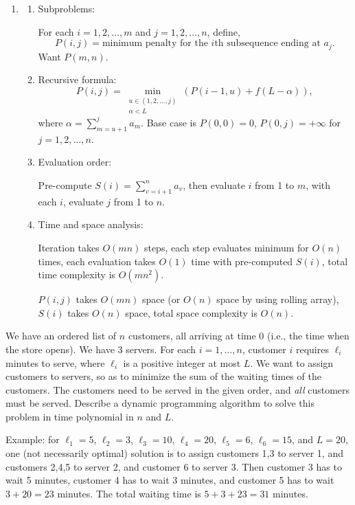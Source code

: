 \documentclass[11pt]{article}
\begin{document}
\begin{description}
\begin{enumerate}
\item[(b)]
  \begin{enumerate}
    \item[(i)] Subproblems:
    
    For each $i = 1, 2, \ldots, m$ and $j = 1, 2, \ldots, n$, define,
    \[
      P(i, j) = \text{minimum penalty for the $i$th subsequence ending at $a_j$}.
    \]
    Want $P(m, n)$.

    \item[(ii)] Recursive formula:
    \[
      P(i, j) = 
      \min_{\substack{u \in (1, 2, \ldots, j) \\ \alpha < L}}(P(i-1, u) + f(L - \alpha)),
    \]
    where $\alpha = \sum_{m=u+1}^{j}a_m$. Base case is $P(0, 0)=0$, $P(0, j)=+\infty$ for 
    $j = 1, 2, \ldots, n$.

    \item[(iii)] Evaluation order:

    Pre-compute $S(i) = \sum_{v=i+1}^{n}a_v$, then evaluate $i$ from 1 to $m$, with each $i$, 
    evaluate $j$ from 1 to $n$.

    \item[(iv)] Time and space analysis:
    
    Iteration takes $O(mn)$ steps, each step evaluates minimum for $O(n)$ times, each 
    evaluation takes $O(1)$ time with pre-computed $S(i)$, total time complexity is $O(mn^2)$.

    $P(i, j)$ takes $O(mn)$ space (or $O(n)$ space by using rolling array), $S(i)$ takes $O(n)$ space, total space complexity is $O(n)$.
  \end{enumerate}

\end{enumerate}

\newpage
\item[Problem 2.3:]
We have an ordered list of $n$ customers, all arriving at time 0 (i.e., the time when the store opens).
We have 3 servers.  For each $i=1,\ldots,n$,
customer $i$ requires $\ell_i$ minutes to serve, where $\ell_i$ is a positive integer at most $L$.
We want to assign customers to servers, so as to minimize the sum of the waiting times
of the customers.  The customers need to be served in the given order, and \emph{all} customers
must be served.
Describe a dynamic programming algorithm to solve this problem in time polynomial in $n$ and $L$.

Example: for $\ell_1=5$, $\ell_2=3$, $\ell_3=10$, $\ell_4=20$, $\ell_5=6$, $\ell_6=15$, and $L=20$,
one (not necessarily optimal) solution is to assign customers 1,3 to server 1, and customers 2,4,5 to server 2,
and customer 6 to server 3.
Then customer 3 has to wait 5 minutes, customer 4 has to wait 3 minutes, and customer 5
has to wait $3+20=23$ minutes.  The total waiting time is $5+3+23=31$ minutes.



\end{description}
\end{document}
